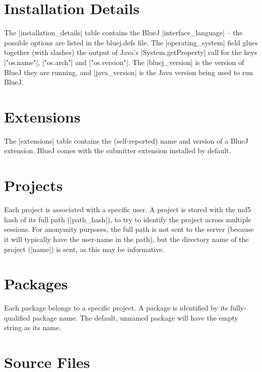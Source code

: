 \documentclass{report}
\newcommand{\myref}[1]{\autoref{#1} on page \pageref*{#1}}
\newcommand{\intern}{This table may be interned, see \myref{def:intern}.}
\begin{document}
\section{Installation Details}


The |installation_details| table contains the BlueJ |interface_language| -- the
possible options are listed in the bluej.defs file.  The |operating_system|
field glues together (with slashes) the output of Java's |System.getProperty|
call for the keys |"os.name"|, |"os.arch"| and |"os.version"|.  The
|bluej_version| is the version of BlueJ they are running, and |java_version|
is the Java version being used to run BlueJ.

\section{Extensions}


The |extensions| table contains the (self-reported) name and version of a
BlueJ extension.  BlueJ comes with the submitter extension installed by default.

\section{Projects}


Each project is associated with a specific user.  A project is stored with the
md5 hash of its full path (|path_hash|), to try to identify the project across multiple
sessions.  For anonymity purposes, the full path is not sent to the server
(because it will typically have the user-name in the path), but the directory
name of the project (|name|) is sent, as this may be informative.

\section{Packages}


Each package belongs to a specific project.  A package is identified by its
fully-qualified package name.  The default, unnamed package will have the
empty string as its name.

\section{Source Files}
\end{document}
